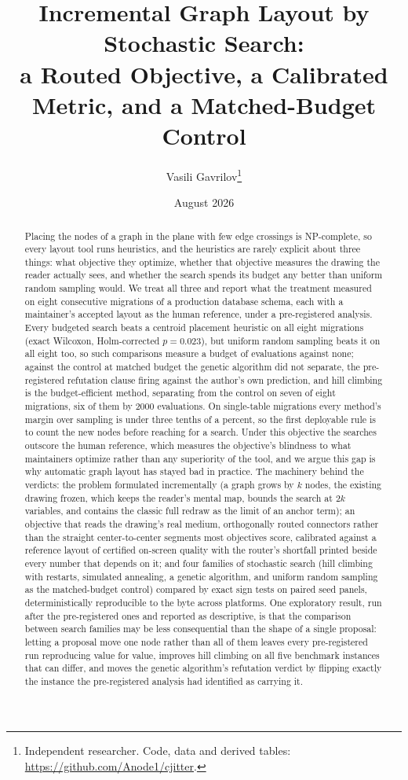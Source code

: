 \documentclass[11pt]{article}
\title{\textbf{Incremental Graph Layout by Stochastic Search:\\
a Routed Objective, a Calibrated Metric, and a Matched-Budget Control}}
\author{Vasili Gavrilov\thanks{Independent researcher. Code, data and derived tables:
\url{https://github.com/Anode1/cjitter}.}}
\date{August 2026}
\begin{document}
\maketitle

\begin{abstract}
Placing the nodes of a graph in the plane with few edge crossings is NP-complete, so every
layout tool runs heuristics, and the heuristics are rarely explicit about three things: what
objective they optimize, whether that objective measures the drawing the reader actually
sees, and whether the search spends its budget any better than uniform random sampling
would. We treat all three and report what the treatment measured on eight consecutive
migrations of a production database schema, each with a maintainer's accepted layout as the
human reference, under a pre-registered analysis. Every budgeted search beats a centroid
placement heuristic on all eight migrations (exact Wilcoxon, Holm-corrected $p = 0.023$),
but uniform random sampling beats it on all eight too, so such comparisons measure a budget
of evaluations against none; against the control at matched budget the genetic algorithm
did not separate, the pre-registered refutation clause firing against the author's own
prediction, and hill climbing is the budget-efficient method, separating from the control
on seven of eight migrations, six of them by 2000 evaluations. On single-table migrations
every method's margin over sampling is under three tenths of a percent, so the first
deployable rule is to count the new nodes before reaching for a search. Under this
objective the searches outscore the human reference, which measures the objective's
blindness to what maintainers optimize rather than any superiority of the tool, and we
argue this gap is why automatic graph layout has stayed bad in practice. The machinery
behind the verdicts: the problem formulated incrementally (a graph grows by $k$ nodes, the
existing drawing frozen, which keeps the reader's mental map, bounds the search at $2k$
variables, and contains the classic full redraw as the limit of an anchor term); an
objective that reads the drawing's real medium, orthogonally routed connectors rather than
the straight center-to-center segments most objectives score, calibrated against a
reference layout of certified on-screen quality with the router's shortfall printed beside
every number that depends on it; and four families of stochastic search (hill climbing
with restarts, simulated annealing, a genetic algorithm, and uniform random sampling as
the matched-budget control) compared by exact sign tests on paired seed panels,
deterministically reproducible to the byte across platforms. One exploratory result, run
after the pre-registered ones and reported as descriptive, is that the comparison between
search families may be less consequential than the shape of a single proposal: letting a
proposal move one node rather than all of them leaves every pre-registered run reproducing
value for value, improves hill climbing on all five benchmark instances that can differ, and
moves the genetic algorithm's refutation verdict by flipping exactly the instance the
pre-registered analysis had identified as carrying it.
\end{abstract}
\end{document}
